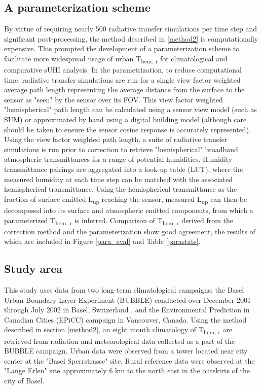 \begin{bibunit}
\subsection{A parameterization scheme}

By virtue of requiring nearly 500 radiative transfer simulations per time step and significant post-processing, the method described in \ref{method2} is computationally expensive. This prompted the development of a parameterization scheme to facilitate more widespread usage of urban T\textsubscript{hem, r} for climatological and comparative sUHI analysis. In the parametrization, to reduce computational time, radiative transfer simulations are run for a single view factor weighted average path length representing the average distance from the surface to the sensor as "seen" by the sensor over its FOV. This view factor weighted "hemispherical" path length can be calculated using a sensor view model (such as SUM) or approximated by hand using a digital building model (although care should be taken to ensure the sensor cosine response is accurately represented). Using the view factor weighted path length, a suite of radiative transfer simulations is run prior to correction to retrieve "hemispherical" broadband atmospheric transmittances for a range of potential humidities. Humidity-transmittance pairings are aggregated into a look-up table (LUT), where the measured humidity at each time step can be matched with the associated hemispherical transmittance. Using the hemispherical transmittance as the fraction of surface emitted L\textsubscript{up} reaching the sensor, measured L\textsubscript{up} can then be decomposed into its surface and atmospheric emitted components, from which a parameterized T\textsubscript{hem, r} is inferred. Comparison of T\textsubscript{hem, r} derived from the correction method and the parameterization show good agreement, the results of which are included in Figure \ref{para_eval} and Table \ref{parastats}.

\subsection{Study area}

This study uses data from two long-term climatological campaigns: the Basel Urban Boundary Layer Experiment (BUBBLE) conducted over December 2001 through July 2002 in Basel, Switzerland \citep{Rotach2005}, and the Environmental Prediction in Canadian Cities (EPiCC) \citep{Voogt2007} campaign in Vancouver, Canada. Using the method described in section \ref{method2}, an eight month climatology of T\textsubscript{hem, r} are retrieved from radiation and meteorological data collected as a part of the BUBBLE campaign. Urban data were observed from a tower located near city center at the "Basel Sperrstrasse" site. Rural reference data were observed at the "Lange Erlen" site approximately 6 \si{\kilo\meter} to the north east in the outskirts of the city of Basel. 


\end{bibunit}

